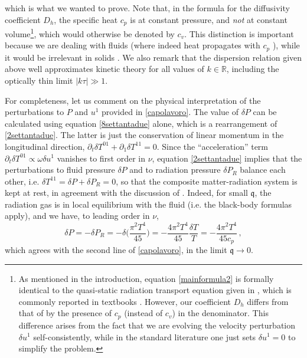 \documentclass[a4paper, amsfonts, amssymb, amsmath, reprint, showkeys, nofootinbib, twoside,notitlepage,onecolumn]{revtex4-2}
\newcommand{\q}{{\mathfrak{q}}}
\theoremstyle{definition}
\theoremstyle{theorem}
\theoremstyle{corollary}
\begin{document}
which is what we wanted to prove. Note that, in the formula for the diffusivity coefficient $D_h$, the specific heat $c_p$ is at constant pressure, and \textit{not} at constant volume\footnote{As mentioned in the introduction, equation \eqref{mainformula2} is formally identical to the quasi-static radiation transport equation given in \cite{Spiegel1957}, which is commonly reported in textbooks \cite[\S 100]{mihalas_book}. However, our coefficient $D_h$ differs from that of \cite{Spiegel1957} by the presence of $c_p$ (instead of $c_v$) in the denominator. This difference arises from the fact that we are evolving the velocity perturbation $\delta u^1$ self-consistently, while in the standard literature one just sets $\delta u^1=0$ to simplify the problem.}, which would otherwise be denoted by $c_v$. This distinction is important because we are dealing with fluids (where indeed heat propagates with $c_p$ \cite[\S 50]{landau6}), while it would be irrelevant in solids \cite[\S 32]{landau7}. We also remark that the dispersion relation given above well approximates kinetic theory for all values of $k\in \mathbb{R}$, including the optically thin limit $|k\tau|\gg 1$.

For completeness, let us comment on the physical interpretation of the perturbations to $P$ and $u^1$ provided in \eqref{capolavoro}. The value of $\delta P$ can be calculated using equation \eqref{8settantadue} alone, which is a rearrangement of \eqref{2settantadue}. The latter is just the conservation of linear momentum in the longitudinal direction, $\partial_t \delta T^{01}+\partial_1 \delta T^{11}=0$. Since the ``acceleration'' term $\partial_t \delta T^{01}\propto \omega \delta u^1$ vanishes to first order in $\nu$, equation \eqref{2settantadue} implies that the perturbations to fluid pressure $\delta P$ and to radiation pressure $\delta P_R$ balance each other, i.e. $\delta T^{11}=\delta P+\delta P_R=0$, so that the composite matter-radiation system is kept at rest, in agreement with the discussion of \citet[\S 50]{landau6}. Indeed, for small $\q$, the radiation gas is in local equilibrium with the fluid (i.e. the black-body formulas apply), and we have, to leading order in $\nu$,
\begin{equation}
\delta P = -\delta P_R = -\delta \bigg(\dfrac{\pi^2 T^4}{45} \bigg) = -\dfrac{4\pi^2T^4}{45} \dfrac{\delta T}{T} = -\dfrac{4\pi^2T^4}{45 c_p} \, ,
\end{equation}
which agrees with the second line of \eqref{capolavoro}, in the limit $\q \rightarrow 0$.
\end{document}
